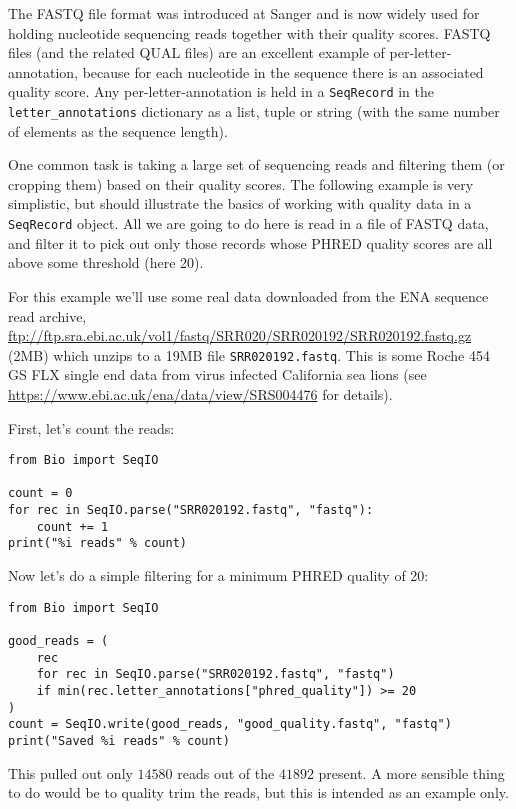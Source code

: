 The FASTQ file format was introduced at Sanger and is now widely used for
holding nucleotide sequencing reads together with their quality scores.
FASTQ files (and the related QUAL files) are an excellent example of
per-letter-annotation, because for each nucleotide in the sequence there is
an associated quality score.  Any per-letter-annotation is held in a
\verb|SeqRecord| in the \verb|letter_annotations| dictionary as a list,
tuple or string (with the same number of elements as the sequence length).

One common task is taking a large set of sequencing reads and filtering them
(or cropping them) based on their quality scores.
The following example is very simplistic, but should illustrate the basics of
working with quality data in a \verb|SeqRecord| object.  All we are going to
do here is read in a file of FASTQ data, and filter it to pick out only those
records whose PHRED quality scores are all above some threshold (here 20).

For this example we'll use some real data downloaded from the ENA sequence
read archive,
\url{ftp://ftp.sra.ebi.ac.uk/vol1/fastq/SRR020/SRR020192/SRR020192.fastq.gz}
(2MB) which unzips to a 19MB file \texttt{SRR020192.fastq}. This is some
Roche 454 GS FLX single end data from virus infected California sea lions
(see \url{https://www.ebi.ac.uk/ena/data/view/SRS004476} for details).

First, let's count the reads:

\begin{verbatim}
from Bio import SeqIO

count = 0
for rec in SeqIO.parse("SRR020192.fastq", "fastq"):
    count += 1
print("%i reads" % count)
\end{verbatim}

\noindent Now let's do a simple filtering for a minimum PHRED quality of 20:

\begin{verbatim}
from Bio import SeqIO

good_reads = (
    rec
    for rec in SeqIO.parse("SRR020192.fastq", "fastq")
    if min(rec.letter_annotations["phred_quality"]) >= 20
)
count = SeqIO.write(good_reads, "good_quality.fastq", "fastq")
print("Saved %i reads" % count)
\end{verbatim}

\noindent This pulled out only $14580$ reads out of the $41892$ present.
A more sensible thing to do would be to quality trim the reads, but this
is intended as an example only.

